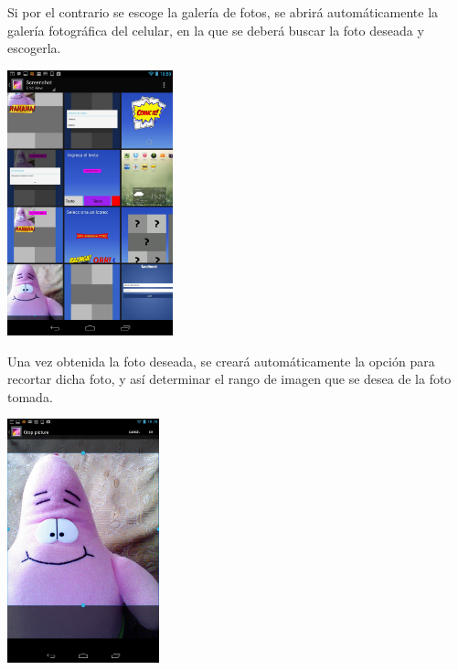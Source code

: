 \documentclass[12pt]{report}
\begin{document}
Si por el contrario se escoge la galería de fotos, se abrirá automáticamente la galería fotográfica del celular, en la que se deberá buscar la foto deseada y escogerla.
\newline
\newline
	\begin{center}
		\begingroup
			\includegraphics[width=0.36\textwidth]{imagenes_usuario/galeria.png}
		\endgroup
	\end{center}


Una vez obtenida la foto deseada, se creará automáticamente la opción para recortar dicha foto, y así determinar el rango de imagen que se desea de la foto tomada.
\newline
	\begin{center}
		\begingroup
			\includegraphics[width=0.33\textwidth]{imagenes_usuario/crop.png}
		\endgroup
	\end{center}
\end{document}
